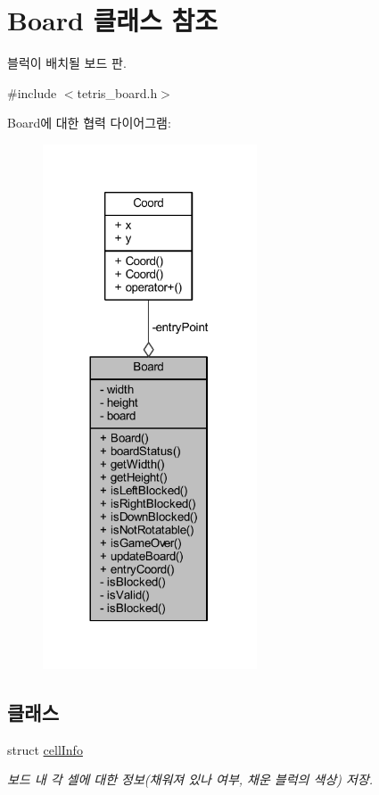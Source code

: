 \hypertarget{class_board}{}\section{Board 클래스 참조}
\label{class_board}


블럭이 배치될 보드 판.  




{\ttfamily \#include $<$tetris\+\_\+board.\+h$>$}



Board에 대한 협력 다이어그램\+:
\nopagebreak
\begin{figure}[H]
\begin{center}
\leavevmode
\includegraphics[width=180pt]{class_board__coll__graph}
\end{center}
\end{figure}
\subsection*{클래스}
\begin{DoxyCompactItemize}
\item 
struct \mbox{\hyperlink{struct_board_1_1cell_info}{cell\+Info}}
\begin{DoxyCompactList}\small\item\em 보드 내 각 셀에 대한 정보(채워져 있나 여부, 채운 블럭의 색상) 저장. \end{DoxyCompactList}\end{DoxyCompactItemize}
